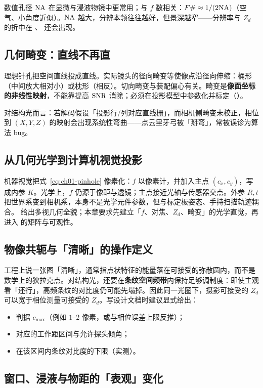 数值孔径 $\mathrm{NA}$ 在显微与浸液物镜中更常用；与 $f$ 数相关：$F\# \approx 1/(2\mathrm{NA})$（空气、小角度近似）。$\mathrm{NA}$ 越大，分辨本领往往越好，但景深越窄——分辨率与 $Z_d$ 的折中在 、 还会出现。

\subsection{几何畸变：直线不再直}

理想针孔把空间直线投成直线。实际镜头的径向畸变等使像点沿径向伸缩：桶形（中间放大相对小）或枕形（相反）。切向畸变与装配偏心有关。畸变是\textbf{像面坐标的非线性映射}，不能靠提高 $\mathrm{SNR}$ 消除；必须在投影模型中参数化并标定（）。

对结构光而言：若解码假设「投影行/列对应直线栅」，而相机侧畸变未校正，相位到 $(X,Y,Z)$ 的映射会出现系统性弯曲——点云里牙弓被「掰弯」，常被误诊为算法 bug。

\subsection{从几何光学到计算机视觉投影}

机器视觉把式~\eqref{eq:ch01-pinhole} 像素化：$f$ 以像素计，并加入主点 $(c_x,c_y)$，写成内参 $K$。光学上，$f$ 仍源于像距与透镜；主点接近光轴与传感器交点。外参 $R,t$ 把世界系变到相机系，本身不是光学元件参数，但与标定板姿态、手持扫描轨迹耦合。\citet{HartleyZisserman2004} 给出多视几何全貌；本章要求先建立「$f$、对焦、$Z_d$、畸变」的光学直觉，再进入  的矩阵与可观性。


\subsection{物像共轭与「清晰」的操作定义}

工程上说一张图「清晰」，通常指点状特征的能量落在可接受的弥散圆内，而不是数学上的狄拉克点。对结构光，还要在\textbf{条纹空间频带}内保持足够调制度：即使主观看「还行」，高频条纹的对比度仍可能先塌掉。因此同一光圈下，摄影可接受的 $Z_d$ 可以宽于相位测量可接受的 $Z_d$。写设计文档时建议显式给出：
\begin{itemize}
  \item 判据 $c_{\max}$（例如 $1$--$2$ 像素，或与相位误差上限反推）；
  \item 对应的工作距区间与允许探头倾角；
  \item 在该区间内条纹对比度的下限（实测）。
\end{itemize}

\subsection{窗口、浸液与物距的「表观」变化}

